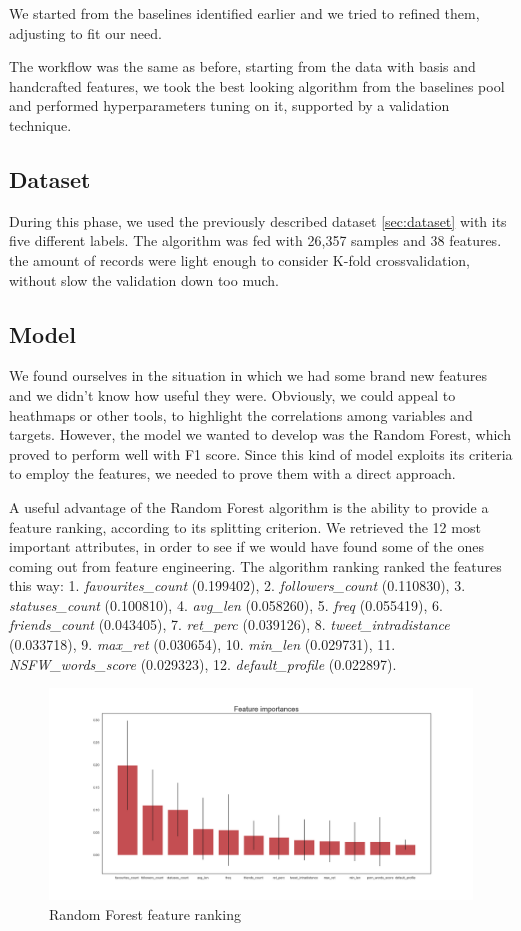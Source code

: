 We started from the baselines identified earlier and we tried to refined them, adjusting to fit our need.

The workflow was the same as before, starting from the data with basis and handcrafted features, we took the best looking algorithm from the baselines pool and performed hyperparameters tuning on it, supported by a validation technique.
\subsection{Dataset}
During this phase, we used the previously described dataset \ref{sec:dataset} with its five different labels.
The algorithm was fed with 26,357 samples and 38 features. the amount of records were light enough to consider K-fold crossvalidation, without slow the validation down too much.
\subsection{Model}
We found ourselves in the situation in which we had some brand new features and we didn't know how useful they were. Obviously, we could appeal to heathmaps or other tools, to highlight the correlations among variables and targets.
However, the model we wanted to develop was the Random Forest, which proved to perform well with F1 score. Since this kind of model exploits its criteria to employ the features, we needed to prove them with a direct approach.

A useful advantage of the Random Forest algorithm is the ability to provide a feature ranking, according to its splitting criterion.
We retrieved the 12 most important attributes, in order to see if we would have found some of the ones coming out from feature engineering.
The algorithm ranking ranked the features this way: 1. \textit{favourites\_count} (0.199402), 2. \textit{followers\_count} (0.110830), 3. \textit{statuses\_count} (0.100810), 4. \textit{avg\_len} (0.058260), 5. \textit{freq} (0.055419), 6. \textit{friends\_count} (0.043405), 7. \textit{ret\_perc} (0.039126), 8. \textit{tweet\_intradistance} (0.033718), 9. \textit{max\_ret} (0.030654), 10. \textit{min\_len} (0.029731), 11. \textit{NSFW\_words\_score} (0.029323), 12. \textit{default\_profile} (0.022897).

\begin{figure}[htp!]
	\centering
	\includegraphics[width=\columnwidth]{chapter5/figure/feature_importances.png}
	\caption{Random Forest feature ranking}
	\label{fig:feature_rank}
\end{figure}

